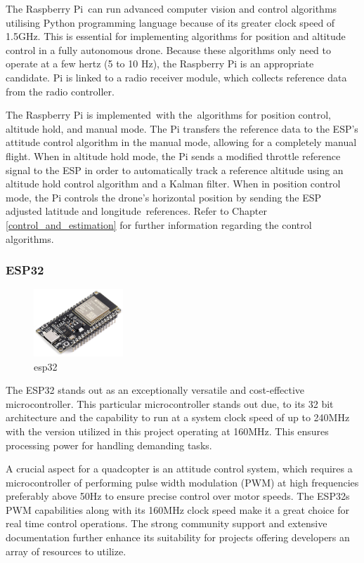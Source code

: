 \documentclass{article}
\begin{document}
The Raspberry Pi can run advanced computer vision and control algorithms utilising Python programming language because of its greater clock speed of 1.5GHz. This is essential for implementing algorithms for position and altitude control in a fully autonomous drone. Because these algorithms only need to operate at a few hertz (5 to 10 Hz), the Raspberry Pi is an appropriate candidate. 
Pi is linked to a radio receiver module, which collects reference data from the radio controller.

The Raspberry Pi is implemented with the algorithms for position control, altitude hold, and manual mode. The Pi transfers the reference data to the ESP's attitude control algorithm in the manual mode, allowing for a completely manual flight. When in altitude hold mode, the Pi sends a modified throttle reference signal to the ESP in order to automatically track a reference altitude 
using an altitude hold control algorithm and a Kalman filter. When in position control mode, the Pi controls the drone's horizontal position by sending the ESP adjusted latitude and longitude references. Refer to Chapter \ref{control_and_estimation} for further information regarding the control algorithms. 

\subsubsection{ESP32}
\begin{figure}[H]
  \centering
  \includegraphics[width=0.3\textwidth]{Pictures/esp32.png}
  \caption{esp32}
  \label{fig:esp32}
\end{figure}
The ESP32 stands out as an exceptionally versatile and cost-effective microcontroller. This particular microcontroller stands out due, to its 32 bit architecture and the capability to run at a system clock speed of up to 240MHz with the version utilized in this project operating at 160MHz. This ensures processing power for handling demanding tasks.

A crucial aspect for a quadcopter is an attitude control system, which requires a microcontroller of performing pulse width modulation (PWM) at high frequencies preferably above 50Hz to ensure precise control over motor speeds. The ESP32s PWM capabilities along with its 160MHz clock speed make it a great choice for real time control operations. The strong community support and extensive 
documentation further enhance its suitability for projects offering developers an array of resources to utilize.
\end{document}
